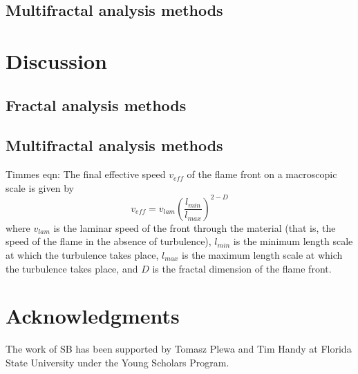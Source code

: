 \documentclass[iop]{emulateapj}
\begin{document}
\subsection{Multifractal analysis methods}\label{MultifractalResults}

\section{Discussion}\label{Discussion}

\subsection{Fractal analysis methods}\label{FractalDiscussion}

\subsection{Multifractal analysis methods}\label{MultifractalDiscussion}


Timmes eqn:
	The final effective speed $v_{eff}$ of the flame front on a macroscopic scale is given by
	\begin{equation} 
	v_{eff} = v_{lam} \left(\frac{l_{min}}{l_{max}}\right)^{2 - D}
	\end{equation}
	where $v_{lam}$ is the laminar speed of the front through the material (that is, the speed of the flame in the absence of turbulence), $l_{min}$ is the minimum length scale at which the turbulence takes place, $l_{max}$ is the maximum length scale at which the turbulence takes place, and $ D $ is the fractal dimension of the flame front.


%
%
%
\section{Acknowledgments}\label{s:ack}
%
The work of SB has been supported by Tomasz Plewa and Tim Handy at Florida State University under the Young Scholars Program.
%
%
%


%
%
%
\end{document}
